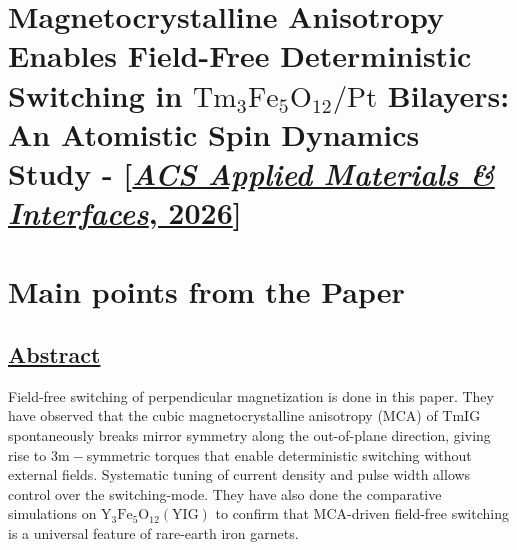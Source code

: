 \section{Magnetocrystalline Anisotropy Enables Field-Free Deterministic Switching in $\mathrm{Tm_3Fe_5O_{12}/Pt}$ Bilayers: An Atomistic Spin Dynamics Study - [\href{https://doi.org/10.1021/acsami.5c23180}{\textit{ACS Applied Materials \& Interfaces}, 2026}]}

\section*{Main points from the Paper}
\subsection*{\centering\underline{Abstract}}
\hspace{2cm} Field-free switching of perpendicular magnetization is done in this paper. They have observed that the cubic magnetocrystalline anisotropy (MCA) of TmIG spontaneously breaks mirror symmetry along the out-of-plane direction, giving rise to $\mathrm{3m-}$symmetric torques that enable deterministic switching without external fields. Systematic tuning of current density and pulse width allows control over the switching-mode. They have also done the comparative simulations on $\mathrm{Y_3Fe_5O_{12} (YIG)}$ to confirm that MCA-driven field-free switching is a universal feature of rare-earth iron garnets.

